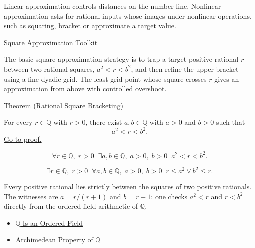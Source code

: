 
\label{sec:square-bracketing-nonlinear-approximation}

\begin{exposition}
Linear approximation controls distances on the number line. Nonlinear
approximation asks for rational inputs whose images under nonlinear
operations, such as squaring, bracket or approximate a target value.
\end{exposition}

\begin{topicbox}{Square Approximation Toolkit}
\begin{exposition}
The basic square-approximation strategy is to trap a target positive rational
$r$ between two rational squares, $a^2 < r < b^2$, and then refine the upper
bracket using a fine dyadic grid. The least grid point whose square crosses $r$
gives an approximation from above with controlled overshoot.
\end{exposition}

\begin{theorembox}{Theorem (Rational Square Bracketing)}
\begin{theorem}
\label{thm:rational-square-bracketing}
For every $r\in\mathbb{Q}$ with $r>0$, there exist $a,b\in\mathbb{Q}$ with
$a>0$ and $b>0$ such that
\[
a^2<r<b^2.
\]
\hyperref[prf:rational-square-bracketing]{Go to proof.}
\end{theorem}
\end{theorembox}

\begin{remark*}
\[
\forall r\in\mathbb{Q},\;r>0\;\;
\exists a,b\in\mathbb{Q},\;a>0,\;b>0\;\;
a^2 < r < b^2.
\]
\end{remark*}

\begin{remark*}
\[
\exists r\in\mathbb{Q},\;r>0\;\;
\forall a,b\in\mathbb{Q},\;a>0,\;b>0\;\;
r\le a^2 \lor b^2\le r.
\]
\end{remark*}

\begin{remark*}[Interpretation]
Every positive rational lies strictly between the squares of two positive
rationals. The witnesses are $a = r/(r+1)$ and $b = r+1$: one checks
$a^2 < r$ and $r < b^2$ directly from the ordered field arithmetic of
$\mathbb{Q}$.
\end{remark*}

\begin{dependencies}
\begin{itemize}
  \item \hyperref[thm:q-is-ordered-field]{$\mathbb{Q}$ Is an Ordered Field}
  \item \hyperref[thm:archimedean-q]{Archimedean Property of $\mathbb{Q}$}
\end{itemize}
\end{dependencies}
\end{topicbox}

